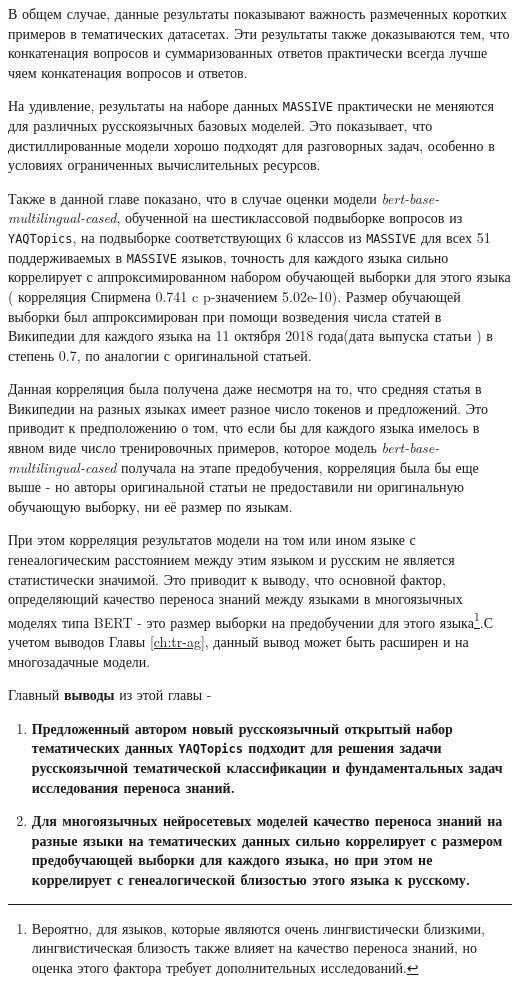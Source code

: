 В общем случае, данные результаты показывают важность размеченных коротких примеров в тематических датасетах. Эти результаты также доказываются тем, что конкатенация вопросов и суммаризованных ответов практически всегда лучше чяем конкатенация вопросов и ответов. 

На удивление, результаты на наборе данных \texttt{MASSIVE} практически не меняются для различных русскоязычных базовых моделей. Это показывает, что дистиллированные модели хорошо подходят для разговорных задач, особенно в условиях ограниченных вычислительных ресурсов. 

Также в данной главе показано, что в случае оценки модели  \textit{bert-base-multilingual-cased}, обученной на шестиклассовой подвыборке вопросов из \texttt{YAQTopics}, на подвыборке соответствующих 6 классов из \texttt{MASSIVE} для всех 51 поддерживаемых в \texttt{MASSIVE} языков, точность для каждого языка сильно коррелирует с аппроксимированном набором обучающей выборки для этого языка ( корреляция Спирмена 0.741 c p-значением 5.02e-10). Размер обучающей выборки был аппроксимирован при помощи возведения числа статей в Википедии для каждого языка на 11 октября 2018 года(дата выпуска статьи \cite{bert}) в степень 0.7, по аналогии с оригинальной статьей. 

Данная корреляция была получена даже несмотря на то, что средняя статья в Википедии на разных языках имеет разное число токенов и предложений. Это приводит к предположению о том, что если бы для каждого языка имелось в явном виде число тренировочных примеров, которое модель \textit{bert-base-multilingual-cased} получала на этапе предобучения, корреляция была бы еще выше - но авторы оригинальной статьи не предоставили ни оригинальную обучающую выборку, ни её размер по языкам. 

При этом корреляция результатов модели на том или ином языке с генеалогическим расстоянием между этим языком и русским не является статистически значимой. Это приводит к выводу, что основной фактор, определяющий качество переноса знаний между языками в многоязычных моделях типа BERT - это размер выборки на предобучении для этого языка\footnote{Вероятно, для языков, которые являются очень лингвистически близкими, лингвистическая близость также влияет на качество переноса знаний, но оценка этого фактора требует дополнительных исследований.}.С учетом выводов Главы \ref{ch:tr-ag}, данный вывод может быть расширен и на многозадачные модели. 

Главный \textbf{выводы} из этой главы - 
\begin{enumerate}
\item \textbf{Предложенный автором новый русскоязычный открытый набор тематических данных \texttt{YAQTopics} подходит для решения задачи русскоязычной тематической классификации и фундаментальных задач исследования переноса знаний.}
\item \textbf{Для многоязычных нейросетевых моделей качество переноса знаний на разные языки на тематических данных сильно коррелирует с размером предобучающей выборки для каждого языка, но при этом не коррелирует с генеалогической близостью этого языка к русскому.}
\end{enumerate}


 